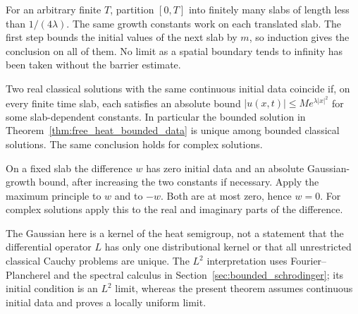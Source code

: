 For an arbitrary finite $T$, partition $[0,T]$ into finitely many
slabs of length less than $1/(4\lambda)$. The same growth constants
work on each translated slab. The first step bounds the initial
values of the next slab by $m$, so induction gives the conclusion
on all of them. No limit as a spatial boundary tends to infinity
has been taken without the barrier estimate.
\Done

\begin{corollary}
\label{cor:heat_gaussian_growth_uniqueness}
Two real classical solutions with the same continuous initial data
coincide if, on every finite time slab, each satisfies an absolute
bound $|u(x,t)|\leq M e^{\lambda|x|^2}$ for some slab-dependent
constants. In particular the bounded solution in
Theorem~\ref{thm:free_heat_bounded_data} is unique among bounded
classical solutions. The same conclusion holds for complex solutions.
\end{corollary}
\Proof
On a fixed slab the difference $w$ has zero initial data and an
absolute Gaussian-growth bound, after increasing the two constants
if necessary. Apply the maximum principle to $w$ and to $-w$.
Both are at most zero, hence $w=0$. For complex solutions apply this
to the real and imaginary parts of the difference.
\Done

The Gaussian here is a kernel of the heat semigroup, not a statement
that the differential operator $L$ has only one distributional kernel
or that all unrestricted classical Cauchy problems are unique.
The $L^2$ interpretation uses Fourier--Plancherel and the spectral
calculus in Section~\ref{sec:bounded_schrodinger}; its initial condition
is an $L^2$ limit, whereas the present theorem assumes continuous
initial data and proves a locally uniform limit.

